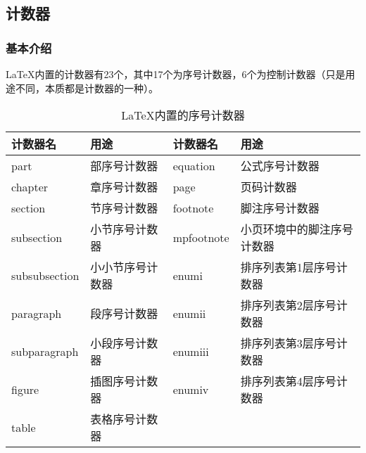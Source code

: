     \subsection{计数器}\label{subsub:counter}

    \subsubsection{基本介绍}
    \LaTeX{}内置的计数器有23个，其中17个为序号计数器，6个为控制计数器（只是用途不同，本质都是计数器的一种）。

    \begin{center}
        \setlength\tablewidth{\dimexpr (\textwidth -8\tabcolsep)}
        \begin{table}[H]
            \begin{tabular}{|p{0.24\tablewidth}<{\centering}|p{0.23\tablewidth}<{\centering}|p{0.26\tablewidth}<{\centering}|p{0.26\tablewidth}<{\centering}|}
                \hline
                计数器名&用途&计数器名&用途\\
                \hline
                part&部序号计数器&equation&公式序号计数器\\
                \hline
                chapter&章序号计数器&page&页码计数器\\
                \hline
                section&节序号计数器&footnote&脚注序号计数器\\
                \hline
                subsection&小节序号计数器&mpfootnote&小页环境中的脚注序号计数器\\
                \hline
                subsubsection&小小节序号计数器&enumi&排序列表第1层序号计数器\\
                \hline
                paragraph&段序号计数器&enumii&排序列表第2层序号计数器\\
                \hline
                subparagraph&小段序号计数器&enumiii&排序列表第3层序号计数器\\
                \hline
                figure&插图序号计数器&enumiv&排序列表第4层序号计数器\\
                \hline
                table&表格序号计数器& &\\
                \hline
            \end{tabular}
            \caption{\LaTeX{}内置的序号计数器}
        \end{table}
    \end{center}


